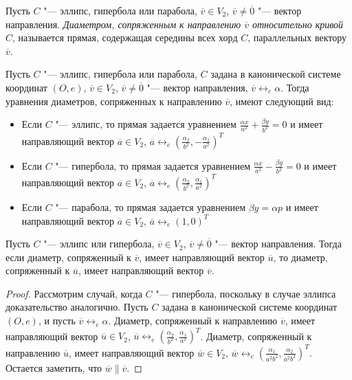 \begin{definition}
	Пусть $C$ "--- эллипс, гипербола или парабола, $\overline{v} \in V_2$, $\overline{v} \ne \overline 0$ "--- вектор направления. \textit{Диаметром, сопряженным к направлению $\overline{v}$ относительно кривой $C$}, называется прямая, содержащая середины всех хорд $C$, параллельных вектору $\overline{v}$.
\end{definition}

\begin{note}
	Пусть $C$ "--- эллипс, гипербола или парабола, $C$ задана в канонической системе координат $(O, e)$, $\overline{v} \in V_2$, $\overline{v} \ne \overline 0$ "--- вектор направления, $\overline{v} \leftrightarrow_{e} \alpha$. Тогда уравнения диаметров, сопряженных к направлению $\overline{v}$, имеют следующий вид:
	\begin{itemize}
		\item Если $C$ "--- эллипс, то прямая задается уравнением $\frac{\alpha x}{a^2} + \frac{\beta y}{b^2} = 0$ и имеет направляющий вектор $\overline a \in V_2$, $\overline{a} \leftrightarrow_{e} (\frac{\alpha_2}{b^2}, -\frac{\alpha_1}{a^2})^T$
		\item Если $C$ "--- гипербола, то прямая задается уравнением $\frac{\alpha x}{a^2} - \frac{\beta y}{b^2} = 0$ и имеет направляющий вектор $\overline a \in V_2$, $\overline{a} \leftrightarrow_{e} (\frac{\alpha_2}{b^2}, \frac{\alpha_1}{a^2})^T$
		\item Если $C$ "--- парабола, то прямая задается уравнением $\beta y = \alpha p$ и имеет направляющий вектор $\overline a \in V_2$, $\overline{a} \leftrightarrow_{e} (1, 0)^T$
	\end{itemize}
\end{note}

\begin{proposition}
	Пусть $C$ "--- эллипс или гипербола, $\overline{v} \in V_2$, $\overline{v} \ne \overline 0$ "--- вектор направления. Тогда если диаметр, сопряженный к $\overline{v}$, имеет направляющий вектор $\overline{u}$, то диаметр, сопряженный к $\overline{u}$, имеет направляющий вектор $\overline{v}$.
\end{proposition}

\begin{proof}
	Рассмотрим случай, когда $C$ "--- гипербола, поскольку в случае эллипса доказательство аналогично. Пусть $C$ задана в канонической системе координат $(O, e)$, и пусть $\overline{v} \leftrightarrow_{e} \alpha$. Диаметр, сопряженный к направлению $\overline{v}$, имеет направляющий вектор $\overline{u} \in V_2$, $\overline u \leftrightarrow_{e} (\frac{\alpha_2}{b^2}, \frac{\alpha_1}{a^2})^T$. Диаметр, сопряженный к направлению $\overline{u}$, имеет направляющий вектор $\overline w \in V_2$, $\overline{w} \leftrightarrow_{e} (\frac{\alpha_1}{a^2b^2}, \frac{\alpha_2}{a^2b^2})^T$. Остается заметить, что $\overline{w} \parallel \overline{v}$.
\end{proof}

